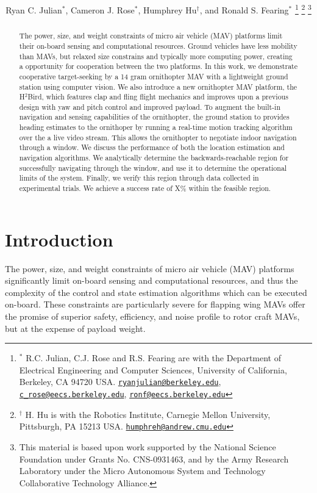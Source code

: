 \documentclass[letterpaper, 10 pt, conference]{ieeeconf}
\title{\LARGE \bf \papertitle}
\author{
    Ryan C. Julian$^{*}$,
    Cameron J. Rose$^{*}$,
    Humphrey Hu$^{\dagger}$, and
    Ronald S. Fearing$^{*}$
    \thanks{$^{*}$
    	R.C. Julian, C.J. Rose and R.S. Fearing are
        with the Department of Electrical Engineering and Computer Sciences,
        University of California, Berkeley, CA 94720 USA.
        \href{mailto:ryanjulian@berkeley.edu}{\tt ryanjulian@berkeley.edu},
        \href{mailto:c\_rose@eecs.berkeley.edu}{\tt c\_rose@eecs.berkeley.edu},
        \href{mailto:ronf@eecs.berkeley.edu}{\tt ronf@eecs.berkeley.edu}
    }
    \thanks{$^{\dagger}$
        H. Hu is with the Robotics Institute,
        Carnegie Mellon University, Pittsburgh, PA 15213 USA.
        \href{mailto:humphreh@andrew.cmu.edu}{\tt humphreh@andrew.cmu.edu}
    }
    \thanks{
        This material is based upon work supported by the National Science
        Foundation under Grants No. CNS-0931463, and by the Army Research
        Laboratory under the Micro Autonomous System and Technology
        Collaborative Technology Alliance.
    }
}
\begin{document}
\maketitle
\thispagestyle{empty}
\pagestyle{empty}

\begin{abstract}
The power, size, and weight constraints of micro air vehicle (MAV) platforms limit their on-board sensing and computational resources. Ground vehicles have less mobility than MAVs, but relaxed size constrains and typically more computing power, creating a opportunity for cooperation between the two platforms. In this work, we demonstrate cooperative target-seeking by a 14 gram ornithopter MAV with a lightweight ground station using computer vision. We also introduce a new ornithopter MAV platform, the H$^2$Bird, which features clap and fling flight mechanics and improves upon a previous design with yaw and pitch control and improved payload. To augment the built-in navigation and sensing capabilities of the ornithopter, the ground station to provides heading estimates to the ornithoper by running a real-time motion tracking algorithm over the a live video stream. This allows the ornithopter to negotiate indoor navigation through a window. We discuss the performance of both the location estimation and navigation algorithms. We analytically determine the backwards-reachable region for successfully navigating through the window, and use it to determine the operational limits of the system. Finally, we verify this region through data collected in experimental trials. We achieve a success rate of X\% within the feasible region.
\end{abstract}

\section{Introduction}
The power, size, and weight constraints of micro air vehicle (MAV) platforms significantly limit on-board sensing and computational resources, and thus the complexity of the control and state estimation algorithms which can be executed on-board. These constraints are particularly severe for flapping wing MAVs offer the promise of superior safety, efficiency, and noise profile to rotor craft MAVs, but at the expense of payload weight.

\end{document}
